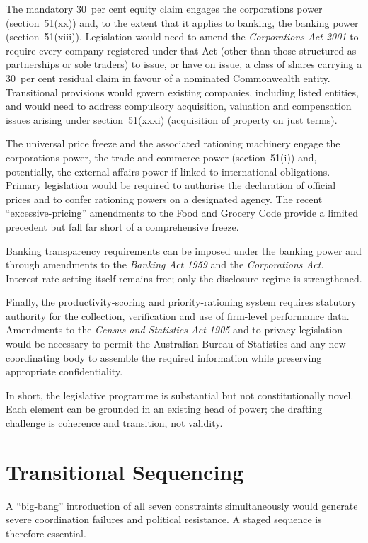 \documentclass[12pt,anyside]{book}
\theoremstyle{definition}
\theoremstyle{plain}
\theoremstyle{remark}
\begin{document}
The mandatory 30~per cent equity claim engages the corporations power (section~51(xx)) and, to the extent that it applies to banking, the banking power (section~51(xiii)). Legislation would need to amend the \textit{Corporations Act 2001} to require every company registered under that Act (other than those structured as partnerships or sole traders) to issue, or have on issue, a class of shares carrying a 30~per cent residual claim in favour of a nominated Commonwealth entity. Transitional provisions would govern existing companies, including listed entities, and would need to address compulsory acquisition, valuation and compensation issues arising under section~51(xxxi) (acquisition of property on just terms).

The universal price freeze and the associated rationing machinery engage the corporations power, the trade-and-commerce power (section~51(i)) and, potentially, the external-affairs power if linked to international obligations. Primary legislation would be required to authorise the declaration of official prices and to confer rationing powers on a designated agency. The recent “excessive-pricing” amendments to the Food and Grocery Code provide a limited precedent but fall far short of a comprehensive freeze.

Banking transparency requirements can be imposed under the banking power and through amendments to the \textit{Banking Act 1959} and the \textit{Corporations Act}. Interest-rate setting itself remains free; only the disclosure regime is strengthened.

Finally, the productivity-scoring and priority-rationing system requires statutory authority for the collection, verification and use of firm-level performance data. Amendments to the \textit{Census and Statistics Act 1905} and to privacy legislation would be necessary to permit the Australian Bureau of Statistics and any new coordinating body to assemble the required information while preserving appropriate confidentiality.

In short, the legislative programme is substantial but not constitutionally novel. Each element can be grounded in an existing head of power; the drafting challenge is coherence and transition, not validity.

\section{Transitional Sequencing}

A “big-bang” introduction of all seven constraints simultaneously would generate severe coordination failures and political resistance. A staged sequence is therefore essential.
\end{document}
